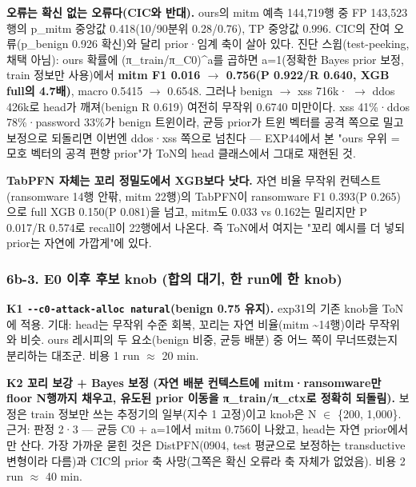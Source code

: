 \par\noindent \textbullet\enspace \textbf{오류는 확신 없는 오류다(CIC와 반대).} ours의 mitm 예측 144,719행 중 FP 143,523행의 p\_\allowbreak{}mitm 중앙값 0.418(10/\allowbreak{}90분위 0.28/\allowbreak{}0.76), TP 중앙값 0.996. CIC의 잔여 오류(p\_\allowbreak{}benign 0.926 확신)와 달리 prior·임계 축이 살아 있다. 진단 스윕(test-peeking, 채택 아님): ours 확률에 (π\_\allowbreak{}train/\allowbreak{}π\_\allowbreak{}C0)\textasciicircum{}a를 곱하면 a=\allowbreak{}1(정확한 Bayes prior 보정, train 정보만 사용)에서 \textbf{mitm F1 0.016 \ensuremath{\rightarrow} 0.756(P 0.922/\allowbreak{}R 0.640, XGB full의 4.7배)}, macro 0.5415 \ensuremath{\rightarrow} 0.6548. 그러나 benign \ensuremath{\rightarrow} xss 716k· \ensuremath{\rightarrow} ddos 426k로 head가 깨져(benign R 0.619) 여전히 무작위 0.6740 미만이다. xss 41\%·ddos 78\%·password 33\%가 benign 트윈이라, 균등 prior가 트윈 벡터를 공격 쪽으로 밀고 보정으로 되돌리면 이번엔 ddos·xss 쪽으로 넘친다 — EXP44에서 본 "ours 우위 =\allowbreak{} 모호 벡터의 공격 편향 prior"가 ToN의 head 클래스에서 그대로 재현된 것.


\par\noindent \textbullet\enspace \textbf{TabPFN 자체는 꼬리 정밀도에서 XGB보다 낫다.} 자연 비율 무작위 컨텍스트(ransomware 14행 안팎, mitm 22행)의 TabPFN이 ransomware F1 0.393(P 0.265)으로 full XGB 0.150(P 0.081)을 넘고, mitm도 0.033 vs 0.162는 밀리지만 P 0.017/\allowbreak{}R 0.574로 recall이 22행에서 나온다. 즉 ToN에서 여지는 "꼬리 예시를 더 넣되 prior는 자연에 가깝게"에 있다.


\subsubsection{6b-3. E0 이후 후보 knob (합의 대기, 한 run에 한 knob)}
\par\noindent \textbullet\enspace \textbf{K1 \texttt{-\allowbreak{}-\allowbreak{}c0-\allowbreak{}att\allowbreak{}ack-\allowbreak{}allo\allowbreak{}c natura\allowbreak{}l}(benign 0.75 유지).} exp31의 기존 knob을 ToN에 적용. 기대: head는 무작위 수준 회복, 꼬리는 자연 비율(mitm \textasciitilde{}14행)이라 무작위와 비슷. ours 레시피의 두 요소(benign 비중, 균등 배분) 중 어느 쪽이 무너뜨렸는지 분리하는 대조군. 비용 1 run \ensuremath{\approx} 20 min.


\par\noindent \textbullet\enspace \textbf{K2 꼬리 보강 +\allowbreak{} Bayes 보정 (자연 배분 컨텍스트에 mitm·ransomware만 floor N행까지 채우고, 유도된 prior 이동을 π\_\allowbreak{}train/\allowbreak{}π\_\allowbreak{}ctx로 정확히 되돌림).} 보정은 train 정보만 쓰는 추정기의 일부(지수 1 고정)이고 knob은 N \ensuremath{\in} \{200, 1,000\}. 근거: 판정 2·3 — 균등 C0 +\allowbreak{} a=\allowbreak{}1에서 mitm 0.756이 나왔고, head는 자연 prior에서만 산다. 가장 가까운 묻힌 것은 DistPFN(0904, test 평균으로 보정하는 transductive 변형이라 다름)과 CIC의 prior 축 사망(그쪽은 확신 오류라 축 자체가 없었음). 비용 2 run \ensuremath{\approx} 40 min.


